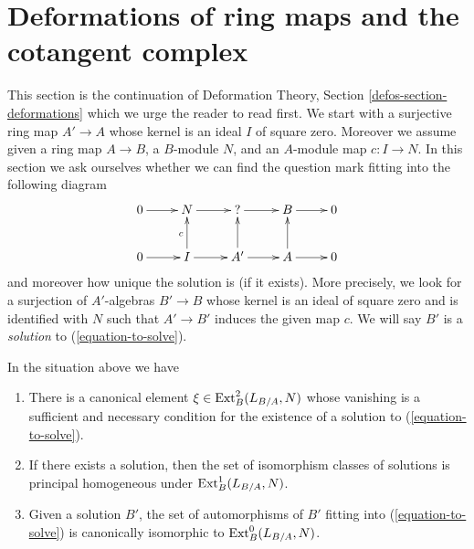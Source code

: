 \section{Deformations of ring maps and the cotangent complex}
\label{section-deformations}

\noindent
This section is the continuation of
Deformation Theory, Section \ref{defos-section-deformations}
which we urge the reader to read first.
We start with a surjective ring map $A' \to A$
whose kernel is an ideal $I$ of square zero. Moreover we assume
given a ring map $A \to B$, a $B$-module $N$, and an $A$-module map
$c : I \to N$. In this section we ask ourselves whether we can find
the question mark fitting into the following diagram
\begin{equation}
\label{equation-to-solve}
\vcenter{
\xymatrix{
0 \ar[r] & N \ar[r] & {?} \ar[r] & B \ar[r] & 0 \\
0 \ar[r] & I \ar[u]^c \ar[r] & A' \ar[u] \ar[r] & A \ar[u] \ar[r] & 0
}
}
\end{equation}
and moreover how unique the solution is (if it exists). More precisely,
we look for a surjection of $A'$-algebras $B' \to B$ whose kernel is
an ideal of square zero and is
identified with $N$ such that $A' \to B'$ induces the given map $c$.
We will say $B'$ is a {\it solution} to (\ref{equation-to-solve}).

\begin{lemma}
\label{lemma-find-obstruction}
In the situation above we have
\begin{enumerate}
\item There is a canonical element $\xi \in \mathop{\mathrm{Ext}}\nolimits^2_B(L_{B/A}, N)$
whose vanishing is a sufficient and necessary condition for the existence
of a solution to (\ref{equation-to-solve}).
\item If there exists a solution, then the set of
isomorphism classes of solutions is principal homogeneous under
$\mathop{\mathrm{Ext}}\nolimits^1_B(L_{B/A}, N)$.
\item Given a solution $B'$, the set of automorphisms of $B'$
fitting into (\ref{equation-to-solve}) is canonically isomorphic
to $\mathop{\mathrm{Ext}}\nolimits^0_B(L_{B/A}, N)$.
\end{enumerate}
\end{lemma}

